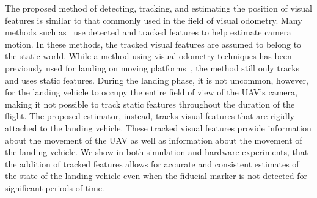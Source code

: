 The proposed method of detecting, tracking, and estimating the position of visual features is
similar to that commonly used in the field of visual odometry. Many methods such
as~\cite{qin2018vins,leutenegger2013keyframe,mourikis2007multi,mur2015orb} use
detected and tracked features to help estimate camera motion.
In these methods, the tracked visual features are assumed to belong to the
static world. While a method using visual odometry techniques has been
previously used for landing on
moving platforms~\cite{falanga2017vision}, the method still only tracks and uses
static features.
During the landing phase, it is not uncommon, however, for the landing vehicle
to occupy the entire field of view of the UAV's camera, making it not possible
to track static features throughout the duration of the flight.
The proposed estimator, instead, tracks
visual features that are rigidly attached to the landing vehicle. These tracked
visual features provide information about the movement of the UAV as well as
information about the movement of the landing vehicle. We show in both
simulation and hardware experiments, that the addition of tracked features allows
for accurate and consistent estimates of the state of the landing vehicle even
when the fiducial marker is not detected for significant periods of time.

